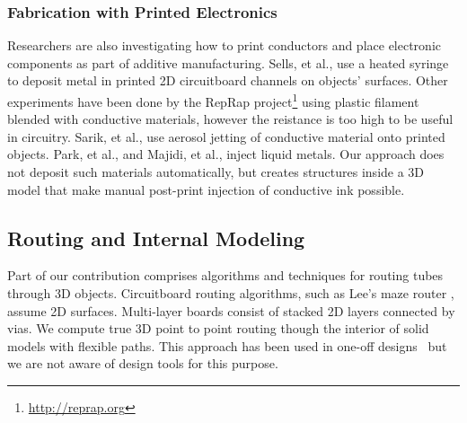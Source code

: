 \subsubsection{Fabrication with Printed Electronics}
Researchers are also investigating how to print conductors and place electronic components as part of additive manufacturing.  Sells, et al., \cite{Sells-reprap} use a heated syringe to deposit metal in printed 2D circuitboard channels on objects' surfaces.  Other experiments have been done by the RepRap project\footnote{\url{http://reprap.org}} using plastic filament blended with conductive materials, however the reistance is too high to be useful in circuitry.  Sarik, et al., \cite{Sarik-tracebrush} use aerosol jetting of conductive material onto printed objects.  Park, et al., \cite{Park-microchannels} and Majidi, et al., \cite{Majidi-curvature} inject liquid metals.   Our approach does not deposit such materials automatically, but creates structures inside a 3D model that make manual post-print injection of conductive ink possible.

\subsection{Routing and Internal Modeling}
Part of our contribution comprises algorithms and techniques for routing tubes through 3D objects.
Circuitboard routing algorithms, such as Lee's maze router \cite{Lee-maze}, assume 2D surfaces. Multi-layer boards consist of stacked 2D layers connected by vias. We compute true 3D point to point routing though the interior of solid models with flexible paths. This approach has been used in one-off designs~\cite{Navarrette-gps} but we are not aware of design tools for this purpose.


